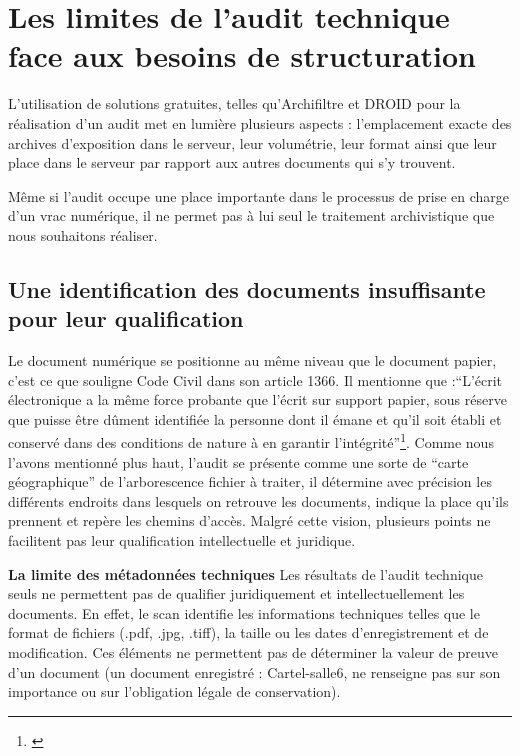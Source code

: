 \section{Les limites de l’audit technique face aux besoins de structuration}


L'utilisation de solutions gratuites, telles qu'Archifiltre et DROID pour la réalisation d'un audit met en lumière plusieurs aspects : l'emplacement exacte des archives d'exposition dans le serveur, leur volumétrie, leur format ainsi que leur place dans le serveur par rapport aux autres documents qui s'y trouvent. 

Même si l'audit occupe une place importante dans le processus de prise en charge d'un vrac numérique, il ne permet pas à lui seul le traitement archivistique que nous souhaitons réaliser.


\subsection*{Une identification des documents insuffisante pour leur qualification}

Le document numérique se positionne au même niveau que le document papier, c'est ce que souligne Code Civil dans son article 1366. Il mentionne que :\enquote{L'écrit électronique a la même force probante que l'écrit sur support papier, sous réserve que puisse être dûment identifiée la personne dont il émane et qu'il soit établi et conservé dans des conditions de nature à en garantir l'intégrité}\footnote{\cite{code-civil-1366}}. Comme nous l'avons mentionné plus haut, l'audit se présente comme une sorte de \enquote{carte géographique} de l'arborescence fichier à traiter, il détermine avec précision les différents endroits dans lesquels on retrouve les documents, indique la place qu'ils prennent et repère les chemins d'accès. Malgré cette vision, plusieurs points ne facilitent pas leur qualification intellectuelle et juridique.

\textbf{La limite des métadonnées techniques }  Les résultats de l'audit technique seuls ne permettent pas de qualifier juridiquement et intellectuellement les documents. En effet, le scan identifie les informations techniques telles que le format de fichiers (.pdf, .jpg, .tiff), la taille ou les dates d'enregistrement et de modification. Ces éléments ne permettent pas de déterminer la valeur de preuve d'un document (un document enregistré : Cartel-salle6, ne renseigne pas sur son importance ou sur l'obligation légale de conservation).

